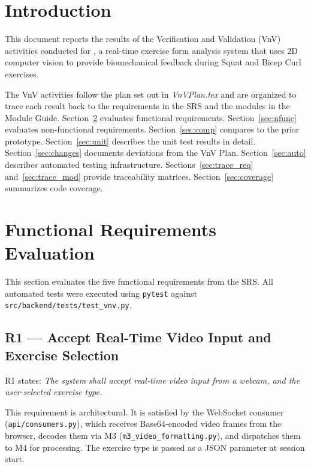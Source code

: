 \documentclass[12pt, titlepage]{article}
\begin{document}
\newpage

\tableofcontents

\listoftables

\newpage


\section{Introduction}

This document reports the results of the Verification and Validation (VnV)
activities conducted for \progname{}, a real-time exercise form analysis system
that uses 2D computer vision to provide biomechanical feedback during Squat and
Bicep Curl exercises.

The VnV activities follow the plan set out in \textit{VnVPlan.tex} and are
organized to trace each result back to the requirements in the SRS and the
modules in the Module Guide. Section~\ref{sec:func} evaluates functional
requirements. Section~\ref{sec:nfunc} evaluates non-functional requirements.
Section~\ref{sec:comp} compares \progname{} to the prior prototype.
Section~\ref{sec:unit} describes the unit test results in detail.
Section~\ref{sec:changes} documents deviations from the VnV Plan.
Section~\ref{sec:auto} describes automated testing infrastructure.
Sections~\ref{sec:trace_req} and~\ref{sec:trace_mod} provide traceability
matrices. Section~\ref{sec:coverage} summarizes code coverage.

\section{Functional Requirements Evaluation}
\label{sec:func}

This section evaluates the five functional requirements from the SRS.
All automated tests were executed using \texttt{pytest} against
\texttt{src/backend/tests/test\_vnv.py}.

\subsection{R1 --- Accept Real-Time Video Input and Exercise Selection}

R1 states: \textit{The system shall accept real-time video input from a webcam,
and the user-selected exercise type.}

This requirement is architectural. It is satisfied by the WebSocket consumer
(\texttt{api/consumers.py}), which receives Base64-encoded video frames from
the browser, decodes them via M3 (\texttt{m3\_video\_formatting.py}), and
dispatches them to M4 for processing. The exercise type is passed as a JSON
parameter at session start.
\end{document}
